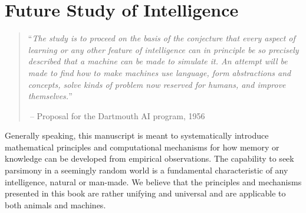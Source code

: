 \documentclass[\toplevelprefix/book-main.tex]{subfiles}
\begin{document}
\chapter{Future Study of Intelligence}
\label{ch:future}


  

\begin{quote}
``{\em The study is to proceed on the basis of the conjecture that every aspect of learning or any other feature of intelligence can in principle be so precisely described that a machine can be made to simulate it. An attempt will be made to find how to make machines use language, form abstractions and concepts, solve kinds of problem now reserved for humans, and improve themselves.}''

$~$\hfill -- Proposal for the Dartmouth AI program, 1956
 \end{quote}
\vspace{5mm}


Generally speaking, this manuscript is meant to systematically introduce mathematical principles and computational mechanisms for how memory or knowledge can be developed from empirical observations. The capability to seek parsimony in a seemingly random world is a fundamental characteristic of any intelligence, natural or man-made. We believe that the principles and mechanisms presented in this book are rather unifying and universal and are applicable to both animals and machines. 
\end{document}
